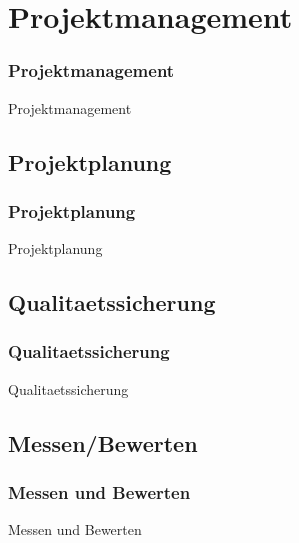 
\section{Projektmanagement}
\begin{frame}[fragile]
	\frametitle{Projektmanagement}
\huge Projektmanagement
\end{frame}

\subsection{Projektplanung}
\begin{frame}
\frametitle{Projektplanung}
\huge Projektplanung
\end{frame}

\subsection{Qualitaetssicherung}
\begin{frame}
\frametitle{Qualitaetssicherung}
\huge Qualitaetssicherung
\end{frame}

\subsection{Messen/Bewerten}
\begin{frame}
\frametitle{Messen und Bewerten}
\huge Messen und Bewerten
\end{frame}

